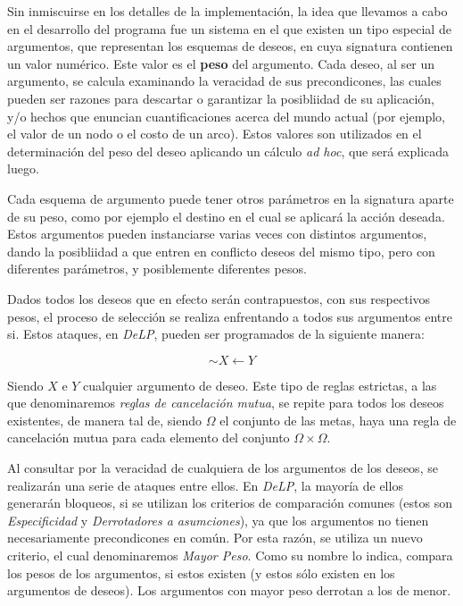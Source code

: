 \documentclass[oneside]{book}
\begin{document}
\label{sec:ideaGeneral}

Sin inmiscuirse en los detalles de la implementación, la idea que llevamos a cabo en el 
desarrollo del programa fue un sistema en el que existen un tipo especial de argumentos,
que representan los esquemas de deseos, en cuya signatura contienen un valor numérico.
Este valor es el \textbf{peso} %
del argumento. Cada deseo, al ser un argumento, se calcula examinando la veracidad de sus
precondicones, las cuales pueden ser razones para descartar o garantizar la posibliidad de
su aplicación, y/o hechos que enuncian cuantificaciones acerca del mundo actual (por 
ejemplo, el valor de un nodo o el costo de un arco). Estos valores son utilizados en el
determinación del peso del deseo aplicando un cálculo \textit{ad hoc}, %
que será explicada luego.

Cada esquema de argumento puede tener otros parámetros en la signatura aparte de su peso,
como por ejemplo el destino en el cual se aplicará la acción deseada. Estos argumentos
pueden instanciarse varias veces con distintos argumentos, dando la posibliidad a que 
entren en conflicto deseos del mismo tipo, pero con diferentes parámetros, y posiblemente
diferentes pesos.

Dados todos los deseos que en efecto serán contrapuestos, con sus respectivos pesos, el 
proceso de selección se realiza enfrentando a todos sus argumentos entre si. Estos 
ataques, en \textit{DeLP}, pueden ser programados de la siguiente manera:

$$ \sim X \leftarrow Y$$ 

Siendo $X$ e $Y$ cualquier argumento de deseo. Este tipo de reglas estrictas, a las que
denominaremos \textit{reglas de cancelación mutua}, se repite 
para todos los deseos existentes, de manera tal de, siendo $\Omega$ el conjunto de las 
metas, haya una regla de cancelación mutua para cada elemento del conjunto
$\Omega \times \Omega$.

Al consultar por la veracidad de cualquiera de los argumentos de los deseos, se 
realizarán una serie de ataques entre ellos. En \textit{DeLP}, la mayoría de ellos
generarán bloqueos, si se 
utilizan los criterios de comparación comunes (estos son \textit{Especificidad} y 
\textit{Derrotadores a asumciones}), ya que los argumentos no tienen necesariamente 
precondicones en común. Por esta razón, se utiliza un nuevo criterio, el cual 
denominaremos \textit{Mayor Peso}. Como su nombre lo indica, compara los pesos de los 
argumentos, si estos existen (y estos sólo existen en los argumentos de deseos). Los 
argumentos con mayor peso derrotan a los de menor.
\end{document}
